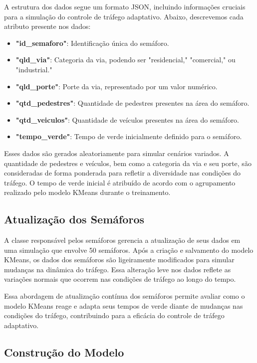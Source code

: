 \documentclass[a4paper, 10pt, conference]{IEEEtran}
\begin{document}
A estrutura dos dados segue um formato JSON, incluindo informações cruciais para a simulação do controle de tráfego adaptativo. Abaixo, descrevemos cada atributo presente nos dados:

\begin{itemize}
  \item \textbf{"id\_semaforo"}: Identificação única do semáforo.
  \item \textbf{"qld\_via"}: Categoria da via, podendo ser "residencial," "comercial," ou "industrial."
  \item \textbf{"qld\_porte"}: Porte da via, representado por um valor numérico.
  \item \textbf{"qtd\_pedestres"}: Quantidade de pedestres presentes na área do semáforo.
  \item \textbf{"qtd\_veiculos"}: Quantidade de veículos presentes na área do semáforo.
  \item \textbf{"tempo\_verde"}: Tempo de verde inicialmente definido para o semáforo.
\end{itemize}

Esses dados são gerados aleatoriamente para simular cenários variados. A quantidade de pedestres e veículos, bem como a categoria da via e seu porte, são consideradas de forma ponderada para refletir a diversidade nas condições do tráfego. O tempo de verde inicial é atribuído de acordo com o agrupamento realizado pelo modelo KMeans durante o treinamento.

\subsection{Atualização dos Semáforos}

A classe responsável pelos semáforos gerencia a atualização de seus dados em uma simulação que envolve 50 semáforos. Após a criação e salvamento do modelo KMeans, os dados dos semáforos são ligeiramente modificados para simular mudanças na dinâmica do tráfego. Essa alteração leve nos dados reflete as variações normais que ocorrem nas condições de tráfego ao longo do tempo.

Essa abordagem de atualização contínua dos semáforos permite avaliar como o modelo KMeans reage e adapta seus tempos de verde diante de mudanças nas condições do tráfego, contribuindo para a eficácia do controle de tráfego adaptativo.


\subsection{Construção do Modelo}
\end{document}
